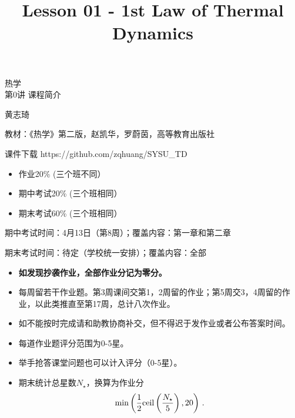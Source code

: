 \documentclass[CJK]{beamer}
\title{Lesson 01 - 1st Law of Thermal Dynamics}
\author{}
\date{}
\begin{document}
\begin{frame}
\begin{center}
\begin{Large}
\bch
热学 \\
第0讲 课程简介

{\vskip 0.3in}

黄志琦

\ech
\end{Large}
\end{center}

\vskip 0.2in

\bch
教材：《热学》第二版，赵凯华，罗蔚茵，高等教育出版社
\ech

\bch
课件下载
\ech
https://github.com/zqhuang/SYSU\_TD
\end{frame}




\begin{frame}
\bch

\begin{itemize}
\item{作业20\% (三个班不同）}
\item{期中考试20\% (三个班相同）}
\item{期末考试60\% (三个班相同）}
\end{itemize}

\skipline

期中考试时间：4月13日（第8周）；覆盖内容：第一章和第二章

期末考试时间：待定（学校统一安排）；覆盖内容：全部
\ech
\end{frame}


\begin{frame}
\bch
\begin{itemize}
\item{{\bf 如发现抄袭作业，全部作业分记为零分。}}
\item{每周留若干作业题。第3周课间交第1，2周留的作业；第5周交3，4周留的作业，以此类推直至第17周，总计八次作业。}
\item{如不能按时完成请和助教协商补交，但不得迟于发作业或者公布答案时间。}
\item{每道作业题评分范围为0-5星。}
\item{举手抢答课堂问题也可以计入评分（0-5星）。}
\item{期末统计总星数$N_\star$，换算为作业分
$$ \min\left( \frac{1}{2}{\rm ceil}\left(\frac{N_\star}{5}\right), 20\right) \, . $$}
\end{itemize}

\ech
\end{frame}
\end{document}
